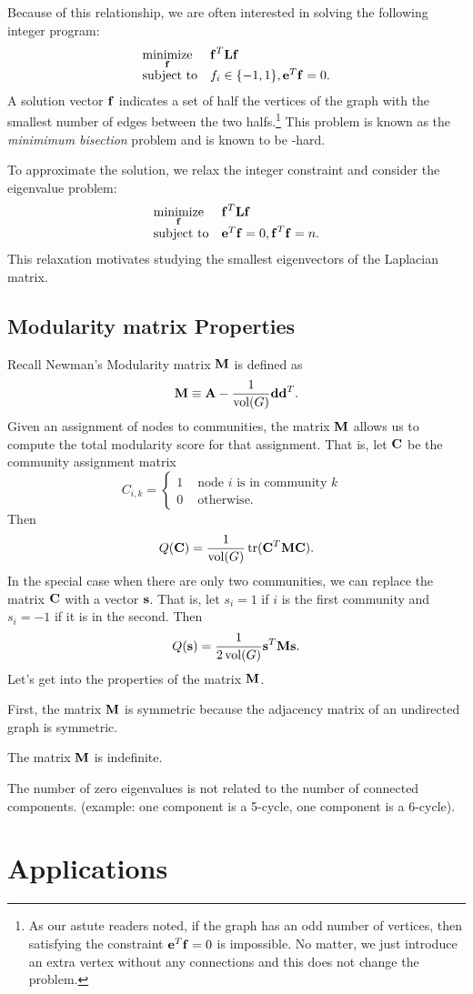 \documentclass[nofonts]{dgleich-article}
\DeclareMathOperator{\trace}{tr}
\DeclareMathOperator{\vol}{vol}
\begin{document}
Because of this relationship, we are often interested in solving the following
integer program:
\[ \begin{array}{ll} {\displaystyle \operatorname*{minimize}_{\ensuremath{\boldsymbol{\mathrm{f}}}}} & \boldsymbol{\mathrm{f}}^T \boldsymbol{\mathrm{L}} \boldsymbol{\mathrm{f}} \\ \text{subject to} & f_i \in \{-1, 1\}, \boldsymbol{\mathrm{e}}^T \boldsymbol{\mathrm{f}} = 0.  \end{array}  \]
A solution vector $\boldsymbol{\mathrm{f}}$ indicates a set of half the vertices of the
graph with the smallest number of edges between the two halfs.\footnote{
As our astute readers noted, if the graph has an odd number of vertices,
then satisfying the constraint $\boldsymbol{\mathrm{e}}^T \boldsymbol{\mathrm{f}} = 0$ is impossible.  No matter,
we just introduce an extra vertex without any connections and this does not 
change the problem.}  This problem is known as the \emph{minimimum bisection}
problem and is known to be -hard.

To approximate the solution, we relax the integer constraint and consider
the eigenvalue problem: 
\[ \begin{array}{ll} {\displaystyle \operatorname*{minimize}_{\ensuremath{\boldsymbol{\mathrm{f}}}}} & \boldsymbol{\mathrm{f}}^T \boldsymbol{\mathrm{L}} \boldsymbol{\mathrm{f}} \\ \text{subject to} & \boldsymbol{\mathrm{e}}^T \boldsymbol{\mathrm{f}} = 0, \boldsymbol{\mathrm{f}}^T \boldsymbol{\mathrm{f}} = n. \end{array} \]
This relaxation motivates studying the smallest eigenvectors of
the Laplacian matrix.


\subsection{Modularity matrix Properties}
Recall Newman's Modularity matrix $\boldsymbol{\mathrm{M}}$
is defined as 
\[ \mM \eqdef \mA - \frac{1}{\vol(G)} \vd \vd^T. \]
Given an assignment of nodes to communities, the matrix
$\boldsymbol{\mathrm{M}}$ allows us to compute the total modularity score 
for that assignment.  That is, 
let $\boldsymbol{\mathrm{C}}$ be the community assignment matrix 
\[ C_{i,k} = \begin{cases} 1 & \text{ node $i$ is in community $k$ } \\
                           0 & \text{ otherwise.}
             \end{cases}
\]
Then 
\[ Q(\mC) = \frac{1}{\vol(G)} \trace(\mC^T \mM \mC). \]
In the special case when there are only two communities, we
can replace the matrix $\boldsymbol{\mathrm{C}}$ with a vector $\boldsymbol{\mathrm{s}}$.  That is,
let $s_{i} = 1$ if $i$ is the first community and $s_{i} = -1$
if it is in the second.  Then 
\[ Q(\vs) = \frac{1}{2 \vol(G)} \vs^T \mM \vs. \]
Let's get into the properties of the matrix $\boldsymbol{\mathrm{M}}$.  

First, the matrix $\boldsymbol{\mathrm{M}}$ is symmetric because the adjacency
matrix of an undirected graph is symmetric.

The matrix $\boldsymbol{\mathrm{M}}$ is indefinite.

The number of zero eigenvalues is not related to the
number of connected components.
(example: one component is a 5-cycle, one component is a 6-cycle).  


\section{Applications}
\end{document}
